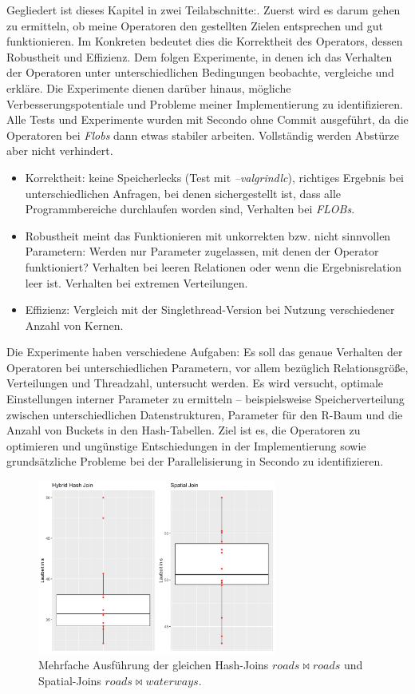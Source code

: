 \documentclass[a4paper,12pt,twoside]{article}
\newcommand{\Fb}[1]{\textit{#1}} %
\begin{document}
{Gegliedert ist dieses Kapitel in zwei Teilabschnitte:. Zuerst wird es darum gehen zu ermitteln, ob meine Operatoren den gestellten Zielen entsprechen und gut funktionieren. Im Konkreten bedeutet dies die Korrektheit des Operators, dessen Robustheit und Effizienz. Dem folgen Experimente, in denen ich das Verhalten der Operatoren unter unterschiedlichen Bedingungen beobachte, vergleiche und erkläre. Die Experimente dienen darüber hinaus, mögliche Verbesserungspotentiale und Probleme meiner Implementierung zu identifizieren. Alle Tests und Experimente wurden mit Secondo ohne Commit ausgeführt, da die Operatoren bei \Fb{Flobs} dann etwas stabiler arbeiten. Vollständig werden Abstürze aber nicht verhindert. 

\begin{itemize}
	\item Korrektheit: keine Speicherlecks (Test mit \Fb{--valgrindlc}), richtiges Ergebnis bei unterschiedlichen Anfragen, bei denen sichergestellt ist, dass alle Programmbereiche durchlaufen worden sind, Verhalten bei \Fb{FLOBs}.
	\item Robustheit meint das Funktionieren mit unkorrekten bzw. nicht sinnvollen Parametern: Werden nur Parameter zugelassen, mit denen der Operator funktioniert? Verhalten bei leeren Relationen oder wenn die Ergebnisrelation leer ist. Verhalten bei extremen Verteilungen.
	\item Effizienz: Vergleich mit der Singlethread-Version bei Nutzung verschiedener Anzahl von Kernen. 
\end{itemize}

Die Experimente haben verschiedene Aufgaben: Es soll das genaue Verhalten der Operatoren bei unterschiedlichen Parametern, vor allem bezüglich Relationsgröße, Verteilungen und Threadzahl, untersucht werden. Es wird versucht, optimale Einstellungen interner Parameter zu ermitteln -- beispielsweise Speicherverteilung zwischen unterschiedlichen Datenstrukturen, Parameter für den R-Baum und die Anzahl von Buckets in den Hash-Tabellen. Ziel ist es, die Operatoren zu optimieren und ungünstige Entschiedungen in der Implementierung sowie grundsätzliche Probleme bei der Parallelisierung in Secondo zu identifizieren.

\begin{figure}
	\centering
	\includegraphics[width=0.70\textwidth]{Bilder/streuung.png}
	\caption{Mehrfache Ausführung der gleichen Hash-Joins $roads \bowtie roads$ und Spatial-Joins $roads \bowtie waterways$.}
	\label{img:streuung}
\end{figure}

}
\end{document}
